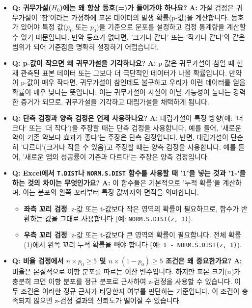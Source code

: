 \documentclass[11pt,a4paper]{article}
\begin{document}
\begin{itemize}
    \item \textbf{Q: 귀무가설($H_0$)에는 왜 항상 등호(=)가 들어가야 하나요?}
    \textbf{A:} 가설 검정은 귀무가설이 '참'이라는 가정하에 표본 데이터의 발생 확률(p-값)을 계산합니다. 등호가 있어야 특정 값($\mu_0$ 또는 $p_0$)을 기준으로 분포를 설정하고 검정 통계량을 계산할 수 있기 때문입니다. 만약 등호가 없다면, '크거나 같다' 또는 '작거나 같다'와 같은 범위가 되어 기준점을 명확히 설정하기 어렵습니다.

    \item \textbf{Q: p-값이 작으면 왜 귀무가설을 기각하나요?}
    \textbf{A:} p-값은 귀무가설이 참일 때 현재 관측된 표본 데이터 또는 그보다 더 극단적인 데이터가 나올 확률입니다. 만약 이 p-값이 매우 작다면, 귀무가설이 참인데도 불구하고 우리가 이런 데이터를 얻을 확률이 매우 낮다는 뜻입니다. 이는 귀무가설이 사실이 아닐 가능성이 높다는 강력한 증거가 되므로, 귀무가설을 기각하고 대립가설을 채택하게 됩니다.

    \item \textbf{Q: 단측 검정과 양측 검정은 언제 사용하나요?}
    \textbf{A:} 대립가설이 특정 방향(예: '더 크다' 또는 '더 작다')을 주장할 때는 단측 검정을 사용합니다. 예를 들어, '새로운 약이 기존 약보다 효과가 좋다'는 주장은 단측 검정입니다. 반면, 대립가설이 단순히 '다르다'(크거나 작을 수 있음)고 주장할 때는 양측 검정을 사용합니다. 예를 들어, '새로운 앱의 성공률이 기존과 다르다'는 주장은 양측 검정입니다.

    \item \textbf{Q: Excel에서 \texttt{T.DIST}나 \texttt{NORM.S.DIST} 함수를 사용할 때 '1'을 넣는 것과 '1-'을 하는 것의 차이는 무엇인가요?}
    \textbf{A:} 이 함수들은 기본적으로 '누적 확률'을 계산하며, 이는 분포의 왼쪽 꼬리부터 특정 값까지의 면적을 의미합니다.
    \begin{itemize}
        \item \textbf{좌측 꼬리 검정}: z-값 또는 t-값보다 작은 영역의 확률이 필요하므로, 함수가 반환하는 값을 그대로 사용합니다 (예: \texttt{NORM.S.DIST(z, 1)}).
        \item \textbf{우측 꼬리 검정}: z-값 또는 t-값보다 큰 영역의 확률이 필요합니다. 전체 확률(1)에서 왼쪽 꼬리 누적 확률을 빼야 합니다 (예: \texttt{1 - NORM.S.DIST(z, 1)}).
    \end{itemize}

    \item \textbf{Q: 비율 검정에서 $n \times p_0 \ge 5$ 및 $n \times (1 - p_0) \ge 5$ 조건은 왜 중요한가요?}
    \textbf{A:} 비율은 본질적으로 이항 분포를 따르는 이산 변수입니다. 하지만 표본 크기($n$)가 충분히 크면 이항 분포를 정규 분포로 근사하여 z-검정을 사용할 수 있습니다. 이 두 조건은 이러한 정규 근사가 타당한지 여부를 판단하는 기준입니다. 이 조건이 충족되지 않으면 z-검정 결과의 신뢰도가 떨어질 수 있습니다.
\end{itemize}
\end{document}
